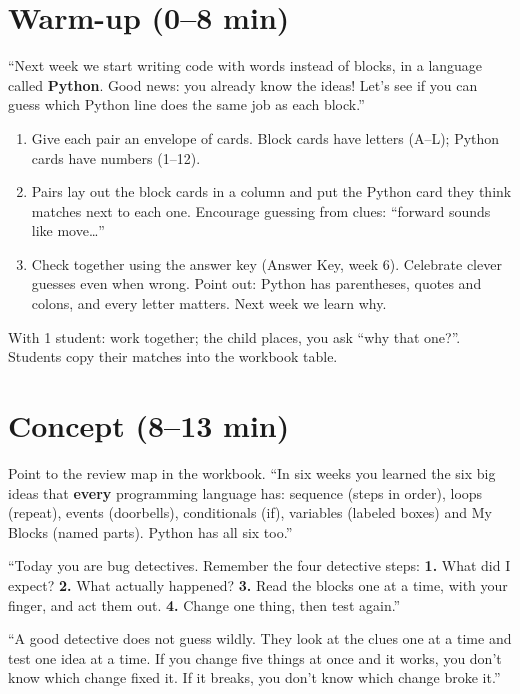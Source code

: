\section{Warm-up (0--8 min)}
\begin{unplugged}
\enquote{Next week we start writing code with words instead of blocks, in a language called \textbf{Python}. Good news: you already know the ideas! Let's see if you can guess which Python line does the same job as each block.}
\begin{enumerate}[leftmargin=1.4em,itemsep=1pt]
  \item Give each pair an envelope of cards. Block cards have letters (A--L); Python cards have numbers (1--12).
  \item Pairs lay out the block cards in a column and put the Python card they think matches next to each one. Encourage guessing from clues: \enquote{forward sounds like move\ldots}
  \item Check together using the answer key (Answer Key, week 6). Celebrate clever guesses even when wrong. Point out: Python has parentheses, quotes and colons, and every letter matters. Next week we learn why.
\end{enumerate}
With 1 student: work together; the child places, you ask \enquote{why that one?}. Students copy their matches into the workbook table.
\end{unplugged}

\section{Concept (8--13 min)}
\begin{teacherscript}
Point to the review map in the workbook. \enquote{In six weeks you learned the six big ideas that \textbf{every} programming language has: sequence (steps in order), loops (repeat), events (doorbells), conditionals (if), variables (labeled boxes) and My Blocks (named parts). Python has all six too.}

\enquote{Today you are bug detectives. Remember the four detective steps: \textbf{1.} What did I expect? \textbf{2.} What actually happened? \textbf{3.} Read the blocks one at a time, with your finger, and act them out. \textbf{4.} Change one thing, then test again.}
\end{teacherscript}

\begin{analogy}
\enquote{A good detective does not guess wildly. They look at the clues one at a time and test one idea at a time. If you change five things at once and it works, you don't know which change fixed it. If it breaks, you don't know which change broke it.}
\end{analogy}

